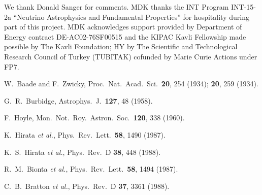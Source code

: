 \documentclass[aps,prd,nofootinbib,twocolumn,floatfix,letterpaper,superscriptaddress,showpacs]{revtex4}
\begin{document}
%
We thank Donald Sanger for comments.
%
MDK thanks the INT Program INT-15-2a ``Neutrino Astrophysics and Fundamental Properties'' for hospitality during part of this project.
%
MDK acknowledges support provided by Department of Energy contract DE-AC02-76SF00515 and the KIPAC Kavli Fellowship made possible by The Kavli Foundation;
HY by The Scientific and Technological Research Council of Turkey (TUBITAK) cofunded by Marie Curie Actions under FP7.


\begin{thebibliography}{99}
\vspace*{-0.6cm}


 W.~Baade and F.~Zwicky,
 Proc.\ Nat.\ Acad.\ Sci.\ {\bf 20}, 254 (1934);
 {\bf 20}, 259 (1934).

  G.~R.~Burbidge,
  Astrophys.\ J.\  {\bf 127}, 48 (1958).

  F.~Hoyle,
  Mon.\ Not.\ Roy.\ Astron.\ Soc.\  {\bf 120}, 338 (1960).


  K.~Hirata {\it et al.},
  Phys.\ Rev.\ Lett.\  {\bf 58}, 1490 (1987).

  K.~S.~Hirata {\it et al.},
  Phys.\ Rev.\  D {\bf 38}, 448 (1988).

  R.~M.~Bionta {\it et al.},
  Phys.\ Rev.\ Lett.\  {\bf 58}, 1494 (1987).

  C.~B.~Bratton {\it et al.},
  Phys.\ Rev.\  D {\bf 37}, 3361 (1988).





\end{thebibliography}
\end{document}
